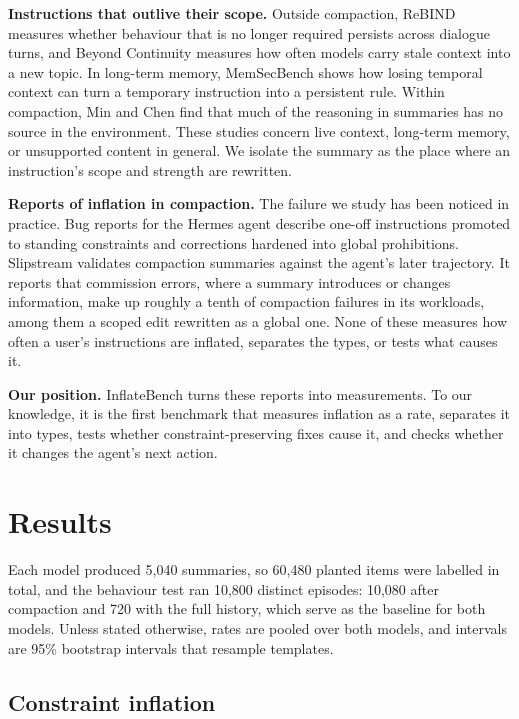 \documentclass[fleqn,10pt]{wlscirep}
\begin{document}
\textbf{Instructions that outlive their scope.} Outside compaction, ReBIND\cite{rebind2026deadtext} measures whether behaviour that is no longer required persists across dialogue turns, and Beyond Continuity\cite{beyondcontinuity2026} measures how often models carry stale context into a new topic. In long-term memory, MemSecBench\cite{memsecbench2026} shows how losing temporal context can turn a temporary instruction into a persistent rule. Within compaction, Min and Chen\cite{min2026prune} find that much of the reasoning in summaries has no source in the environment. These studies concern live context, long-term memory, or unsupported content in general. We isolate the summary as the place where an instruction's scope and strength are rewritten.

\textbf{Reports of inflation in compaction.} The failure we study has been noticed in practice. Bug reports for the Hermes agent describe one-off instructions promoted to standing constraints and corrections hardened into global prohibitions\cite{hermes2026issue}. Slipstream\cite{chen2026slipstream} validates compaction summaries against the agent's later trajectory. It reports that commission errors, where a summary introduces or changes information, make up roughly a tenth of compaction failures in its workloads, among them a scoped edit rewritten as a global one. None of these measures how often a user's instructions are inflated, separates the types, or tests what causes it.

\textbf{Our position.} InflateBench turns these reports into measurements. To our knowledge, it is the first benchmark that measures inflation as a rate, separates it into types, tests whether constraint-preserving fixes cause it, and checks whether it changes the agent's next action.

\section*{Results}

Each model produced 5,040 summaries, so 60,480 planted items were labelled in total, and the behaviour test ran 10,800 distinct episodes: 10,080 after compaction and 720 with the full history, which serve as the baseline for both models. Unless stated otherwise, rates are pooled over both models, and intervals are 95\% bootstrap intervals that resample templates.

\subsection*{Constraint inflation}
\end{document}

